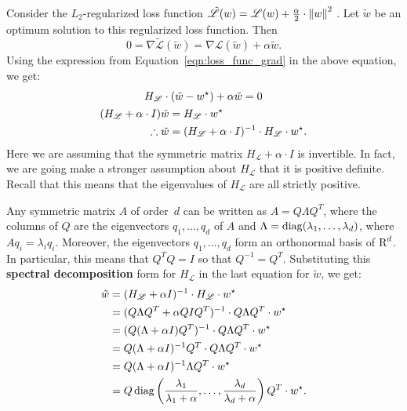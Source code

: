 Consider the $L_2$-regularized loss function 
$\tilde{\mathscr{L}}(w) = \mathscr{L}(w) + \frac{\alpha}{2} \cdot \left\lVert w\right\rVert^2$ .
Let $\tilde{w}$ be an optimum solution to this regularized loss function. Then 
\begin{equation}
\label{eqn:reg_loss_func_grad}
    0 = \nabla \tilde{\mathscr{L}}(\tilde{w}) = 
        \nabla \mathscr{L}(\tilde{w}) 
        + \alpha \tilde{w}.
\end{equation}
Using the expression from Equation~\ref{eqn:loss_func_grad} in the above equation, 
we get:
\begin{gather}
H_{\mathscr{L}} \cdot (\tilde{w} - w^{\star}) + \alpha \tilde{w} = 0 \notag \\
\begin{split}
(H_{\mathscr{L}} + \alpha \cdot I) \tilde{w} & = H_{\mathscr{L}} \cdot w^{\star} \\
\therefore \tilde{w} & = (H_{\mathscr{L}} + \alpha \cdot I)^{-1} \cdot H_{\mathscr{L}} \cdot w^{\star}.
\end{split}
\end{gather}
Here we are assuming that the symmetric matrix $H_{\mathscr{L}} + \alpha \cdot I$
is invertible. In fact, we are going make a stronger assumption about $H_{\mathscr{L}}$
that it is positive definite. Recall that this means that the eigenvalues of 
$H_{\mathscr{L}}$ are all strictly positive. 

Any symmetric matrix $A$ of order~$d$ can be written as $A = Q \Lambda Q^{T}$, 
where the columns of $Q$ are the eigenvectors $q_1, \ldots, q_d$ of $A$ and 
$\Lambda = \operatorname{diag}(\lambda_1, \ldots, \lambda_d)$, where $A q_i = \lambda_i q_i$.
Moreover, the eigenvectors $q_1, \ldots, q_d$ form an orthonormal basis of $\text{R}^{d}$. 
In particular, this means that $Q^{T}Q = I$ so that $Q^{-1} = Q^{T}$. Substituting 
this \textbf{spectral decomposition} form for $H_{\mathscr{L}}$ in the last 
equation for $\tilde{w}$, we get:
\begin{align}
    \label{eqn:optimal_regularized_solution}
    \tilde{w} 
        & = (H_{\mathscr{L}} + \alpha I)^{-1} \cdot H_{\mathscr{L}} \cdot w^{\star} \nonumber \\ 
        & = (Q \Lambda Q^{T} + \alpha Q I Q^{T})^{-1} \cdot Q \Lambda Q^{T} \cdot w^{\star} \nonumber \\
        & = (Q (\Lambda + \alpha I )Q^{T})^{-1} \cdot Q \Lambda Q^{T} \cdot w^{\star} \nonumber \\
        & = Q (\Lambda + \alpha I)^{-1} Q^{T} \cdot Q \Lambda Q^{T} \cdot w^{\star} \nonumber \\
        & = Q (\Lambda + \alpha I)^{-1} \Lambda Q^{T} \cdot w^{\star} \nonumber \\
        & = Q 
            \operatorname{diag} \left ( \frac{\lambda_1}{\lambda_1 + \alpha}, \ldots, \frac{\lambda_d}{\lambda_d + \alpha} \right ) 
            Q^{T} \cdot w^{\star}.
\end{align} 

